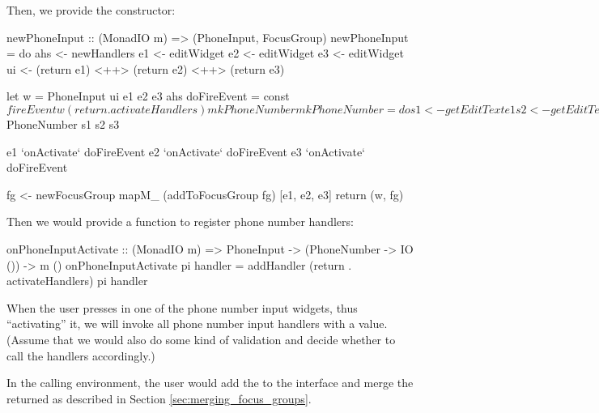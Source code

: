 Then, we provide the constructor:

\begin{haskellcode}
 newPhoneInput :: (MonadIO m) => (PhoneInput, FocusGroup)
 newPhoneInput = do
   ahs <- newHandlers
   e1 <- editWidget
   e2 <- editWidget
   e3 <- editWidget
   ui <- (return e1) <++> (return e2) <++> (return e3)

   let w = PhoneInput ui e1 e2 e3 ahs
       doFireEvent = const $
         fireEvent w (return . activateHandlers) mkPhoneNumber

       mkPhoneNumber = do
         s1 <- getEditText e1
         s2 <- getEditText e2
         s3 <- getEditText e3
         return $ PhoneNumber s1 s2 s3

   e1 `onActivate` doFireEvent
   e2 `onActivate` doFireEvent
   e3 `onActivate` doFireEvent

   fg <- newFocusGroup
   mapM_ (addToFocusGroup fg) [e1, e2, e3]
   return (w, fg)
\end{haskellcode}

Then we would provide a function to register phone number handlers:

\begin{haskellcode}
 onPhoneInputActivate :: (MonadIO m) => PhoneInput
                      -> (PhoneNumber -> IO ()) -> m ()
 onPhoneInputActivate pi handler =
   addHandler (return . activateHandlers) pi handler
\end{haskellcode}

When the user presses  in one of the phone number input
widgets, thus ``activating'' it, we will invoke all phone number input
handlers with a  value.  (Assume that we would also do
some kind of validation and decide whether to call the handlers
accordingly.)

In the calling environment, the user would add the
 to the interface and merge the returned
 as described in Section
\ref{sec:merging_focus_groups}.
